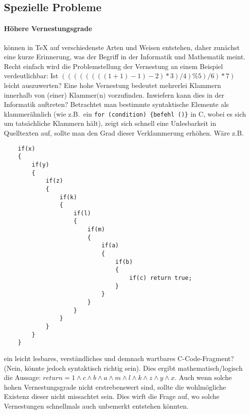 \newpage
\subsection{Spezielle Probleme}
\paragraph*{Höhere Vernestungsgrade}%
können in \TeX{} auf verschiedenste Arten und Weisen entstehen, daher zunächst eine kurze Erinnerung, was der Begriff in der Informatik und Mathematik meint. Recht einfach wird die Problemstellung der Vernestung an einem Beispiel verdeutlichbar: Ist $((((((((1+1)-1)-2)*3)/4)\% 5)/6)*7)$ leicht auszuwerten? Eine hohe Vernestung bedeutet mehrerlei Klammern innerhalb von (einer) Klammer$($n$)$ vorzufinden. Inwiefern kann dies in der Informatik auftreten? Betrachtet man bestimmte syntaktische Elemente als klammerähnlich (wie z.B.\ ein \texttt{for (condition) \{befehl~()\}} in C, wobei es sich um tatsächliche Klammern hält), zeigt sich schnell eine Unlesbarkeit in Quelltexten auf, sollte man den Grad dieser Verklammerung erhöhen. Wäre z.B.\ 
\begin{verbatim}
    if(x)
    {
        if(y)
        {
            if(z)
            {
                if(k)
                {
                    if(l)
                    {
                        if(m)
                        {
                            if(a)
                            {
                                if(b)
                                {
                                    if(c) return true;
                                }
                            }
                        }
                    }
                }
            }
        }
    }
\end{verbatim}
ein leicht lesbares, verständliches und demnach wartbares C-Code-Fragment? (Nein, könnte jedoch syntaktisch richtig sein). Dies ergibt mathematisch/logisch die Aussage: $return=1\land c\land b\land a\land m\land l\land k\land z\land y\land x$. Auch wenn solche hohen Vernestungsgrade nicht erstrebenswert sind, sollte die wohlmögliche Existenz dieser nicht missachtet sein. Dies wirft die Frage auf, wo solche Vernestungen schnellmals auch unbemerkt entstehen könnten.

